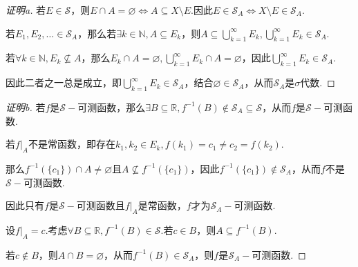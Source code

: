 \begin{proof}[证明a]
    若\(E \in \mathcal{S}\)，则\(E \cap A=\varnothing \Longleftrightarrow A \subseteq X \setminus E\).因此\(E \in \mathcal{S}_A \Longleftrightarrow X \setminus E \in \mathcal{S}_A\).
    
    若\(E_1, E_2, \dots \in \mathcal{S}_A\)，那么若\(\exists k \in \mathbb{N}, A \subseteq E_k\)，则\(A \subseteq \bigcup_{k=1}^\infty E_k, \bigcup_{k=1}^\infty E_k \in \mathcal{S}_A\).

    若\(\forall k \in \mathbb{N}, E_k \nsubseteq A\)，那么\(E_k \cap A=\varnothing, \bigcup_{k=1}^\infty E_k \cap A=\varnothing\)，因此\(\bigcup_{k=1}^\infty E_k \in \mathcal{S}_A\).

    因此二者之一总是成立，即\(\bigcup_{k=1}^\infty E_k \in \mathcal{S}_A\)，结合\(\varnothing \in \mathcal{S}_A\)，从而\(\mathcal{S}_A\)是\(\sigma\)代数.
\end{proof}

\begin{proof}[证明b]
    若\(f\)是\(\mathcal{S}-\)可测函数，那么\(\exists B \subseteq \mathbb{R}, f^{-1}(B) \notin \mathcal{S}_A \subseteq \mathcal{S}\)，从而\(f\)是\(\mathcal{S}-\)可测函数.

    若\(\left.f\right|_A\)不是常函数，即存在\(k_1, k_2 \in E_k, f(k_1)=c_1 \ne c_2=f(k_2)\).

    那么\(f^{-1}(\{c_1\}) \cap A \ne \varnothing\)且\(A \nsubseteq f^{-1}(\{c_1\})\)，因此\(f^{-1}(\{c_1\}) \notin \mathcal{S}_A\)，从而\(f\)不是\(\mathcal{S}-\)可测函数.

    {\kaishu 因此只有\(f\)是\(\mathcal{S}-\)可测函数且\(\left.f\right|_A\)是常函数，\(f\)才为\(\mathcal{S}_A-\)可测函数}.

    设\(\left.f\right|_A=c\).考虑\(\forall B \subseteq \mathbb{R}, f^{-1}(B) \in \mathcal{S}\).若\(c \in B\)，则\(A \subseteq f^{-1}(B)\).

    若\(c \notin B\)，则\(A \cap B=\varnothing\)，从而\(f^{-1}(B) \in \mathcal{S}_A\)，则\(f\)是\(\mathcal{S}_A-\)可测函数.
\end{proof}

\begin{comment}
    \begin{problem}[17]\label{2.B.17}
        设\(f: X \to \mathbb{R}\)满足\(D=\{x \in X: f(x) \text{在} x \text{处不连续}\}\)是可数集.

        其中\(X \subseteq \mathbb{R}\)是borel集.证明：\(f\)是borel可测函数.
    \end{problem}

    \begin{proof}
        \(f^{-1}((a,\infty))=(\left.f\right|_{D^c})^{-1}((a,\infty)) \cup (\left.f\right|_{D})^{-1}((a,\infty))\)，则\(\left.f\right|_{D^c}\)是连续函数.
        
        于是存在开集\(G\)使得\(A=(\left.f\right|_{D^c})^{-1}((a,\infty))=G \cap D^c\)，从而\(A\)是\textit{borel}集.
        
        \(B=(\left.f\right|_{D})^{-1}((a,\infty))\)是可数集，也是\textit{borel}集，那么\(A \cup B\)是\textit{borel}集.
    \end{proof}
\end{comment}


